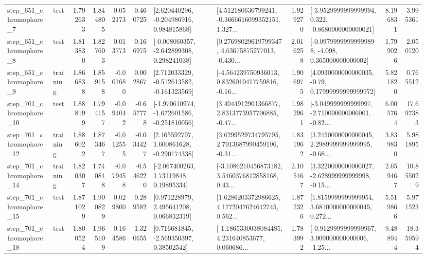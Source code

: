 \begin{tabular}{llrrrrllrlrr}
   step\_651\_chromophore\_7 &      test &      1.792633 &    1.844805 &      0.052173 &  0.460725 &    [2.620440296, -0.204986916, 0.984815868] &  [4.512180630799241, -0.3666616099352151, 1.327... &       1.929270 &  [-3.9529999999999994, 0.322, -0.8680000000000021] &            8.196831 &          3.995361 \\
   step\_651\_chromophore\_8 &      test &      1.813830 &    1.827603 &      0.013773 &  0.166975 &   [-0.008060357, -2.642899308, 0.298241038] &  [0.27698029619799347, 4.63675875277013, -0.430... &       2.016258 &  [-0.09799999999999898, -4.098, 0.365000000000002] &            1.799026 &          2.050720 \\
   step\_651\_chromophore\_9 &  training &      1.866838 &    1.859158 &     -0.007680 &  0.002867 &   [2.712033329, -0.512613582, -0.161323569] &  [-4.564239750936013, 0.8326010417759816, -0.16... &       1.906975 &   [4.0930000000000035, -0.79, 0.17999999999999972] &            5.821820 &          0.765512 \\
  step\_701\_chromophore\_10 &      test &      1.888199 &    1.794157 &     -0.094042 & -0.657778 &  [-1.970610974, -1.672601586, -0.251810056] &  [3.4044912901366877, 2.8313773957706885, -0.47... &       1.982961 &  [-3.049999999999997, -2.710000000000001, -0.82... &            6.005764 &         17.697383 \\
  step\_701\_chromophore\_12 &  training &      1.886022 &    1.873467 &     -0.012555 & -0.034427 &    [2.165592797, 1.600861628, -0.290174338] &  [3.6299529734795795, 2.7013687990459196, -0.31... &       1.831962 &  [3.2450000000000045, 2.2989999999999995, -0.68... &            3.839830 &          5.981895 \\
  step\_701\_chromophore\_14 &  training &      1.820307 &    1.740848 &     -0.079458 & -0.546220 &      [-2.067400263, 1.73119848, 0.19895334] &  [-3.1086210456873182, 3.5460376812858168, 0.43... &       2.105467 &  [3.3220000000000027, -2.628999999999998, -0.15... &            2.659467 &         10.855029 \\
  step\_701\_chromophore\_15 &      test &      1.871029 &    1.900829 &      0.029800 &  0.289582 &     [0.971228979, 2.495641208, 0.066832319] &  [1.6286203372986625, 4.1772047624642745, 0.562... &       1.872326 &  [1.8159999999999954, 3.6810000000000045, 0.272... &            5.519866 &          5.971523 \\
  step\_701\_chromophore\_18 &      test &      1.800524 &    1.965109 &      0.164586 &  1.320655 &     [0.716681845, -2.569350397, 0.38502542] &  [-1.1865330038084485, 4.231640853677, 0.060686... &       1.783992 &  [-0.9129999999999967, 3.909000000000006, -1.25... &            9.488944 &         18.359594 \\

\end{tabular}
